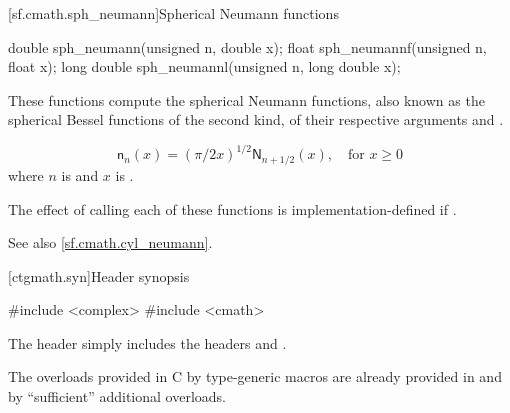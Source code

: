[sf.cmath.sph_neumann]{Spherical Neumann functions}%
%
%
%
%
%
%
\begin{itemdecl}
double       sph_neumann(unsigned n, double x);
float        sph_neumannf(unsigned n, float x);
long double  sph_neumannl(unsigned n, long double x);
\end{itemdecl}

\begin{itemdescr}

\pnum\effects
These functions compute the spherical Neumann functions,
also known as the spherical Bessel functions of the second kind,
of their respective arguments
 and .

\pnum\returns
\[%
  \mathsf{n}_n(x) =
  (\pi/2x)^{1\!/\!2} \mathsf{N}_{n + 1\!/\!2}(x),
	   \quad \mbox{for $x \ge 0$}
\]
where
$n$ is  and
$x$ is .

\pnum\remark
The effect of calling each of these functions
is implementation-defined
if .

\pnum See also \ref{sf.cmath.cyl_neumann}.
\end{itemdescr}


[ctgmath.syn]{Header  synopsis}

%
\begin{codeblock}
#include <complex>
#include <cmath>
\end{codeblock}

\pnum
The header  simply includes the headers 
and .

\pnum
\begin{note} The overloads provided in C by type-generic macros are already
provided in  and  by ``sufficient'' additional
overloads.\end{note}
